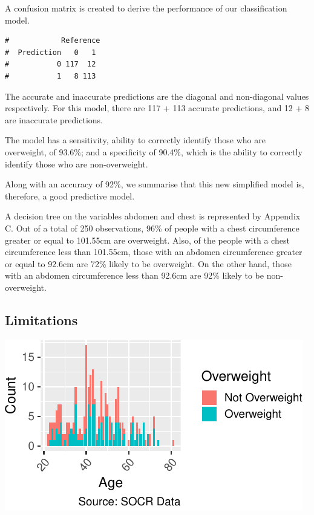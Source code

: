 \documentclass[a4paper,9pt,twocolumn,twoside,]{pinp}
\begin{document}
A confusion matrix is created to derive the performance of our
classification model.

\begin{ShadedResult}
\begin{verbatim}
#            Reference
#  Prediction   0   1
#           0 117  12
#           1   8 113
\end{verbatim}
\end{ShadedResult}

The accurate and inaccurate predictions are the diagonal and
non-diagonal values respectively. For this model, there are 117 + 113
accurate predictions, and 12 + 8 are inaccurate predictions.

The model has a sensitivity, ability to correctly identify those who are
overweight, of 93.6\%; and a specificity of 90.4\%, which is the ability
to correctly identify those who are non-overweight.

Along with an accuracy of 92\%, we summarise that this new simplified
model is, therefore, a good predictive model.

A decision tree on the variables abdomen and chest is represented by
Appendix C. Out of a total of 250 observations, 96\% of people with a
chest circumference greater or equal to 101.55cm are overweight. Also,
of the people with a chest circumference less than 101.55cm, those with
an abdomen circumference greater or equal to 92.6cm are 72\% likely to
be overweight. On the other hand, those with an abdomen circumference
less than 92.6cm are 92\% likely to be non-overweight.

\hypertarget{limitations}{%
\subsection{Limitations}\label{limitations}}

\begin{center}\includegraphics{Executive_Report_files/figure-latex/unnamed-chunk-4-1} \end{center}
\end{document}
